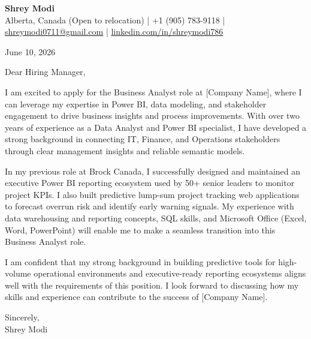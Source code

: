 \documentclass[11pt,letterpaper]{article}
\begin{document}
\begin{center}
  {\Large \bfseries \color{accent} Shrey Modi}\\[0.2em]
  {\small
    Alberta, Canada (Open to relocation)
 | +1 (905) 783-9118 | \href{mailto:shreymodi0711@gmail.com}{shreymodi0711@gmail.com} | \href{https://linkedin.com/in/shreymodi786}{linkedin.com/in/shreymodi786}  }
\end{center}

\vspace{1em}

June 10, 2026

\vspace{0.5em}


\vspace{0.5em}

Dear Hiring Manager,

I am excited to apply for the Business Analyst role at [Company Name], where I can leverage my expertise in Power BI, data modeling, and stakeholder engagement to drive business insights and process improvements. With over two years of experience as a Data Analyst and Power BI specialist, I have developed a strong background in connecting IT, Finance, and Operations stakeholders through clear management insights and reliable semantic models.

In my previous role at Brock Canada, I successfully designed and maintained an executive Power BI reporting ecosystem used by 50+ senior leaders to monitor project KPIs. I also built predictive lump-sum project tracking web applications to forecast overrun risk and identify early warning signals. My experience with data warehousing and reporting concepts, SQL skills, and Microsoft Office (Excel, Word, PowerPoint) will enable me to make a seamless transition into this Business Analyst role.

I am confident that my strong background in building predictive tools for high-volume operational environments and executive-ready reporting ecosystems aligns well with the requirements of this position. I look forward to discussing how my skills and experience can contribute to the success of [Company Name].

Sincerely,\\
Shrey Modi
\end{document}
